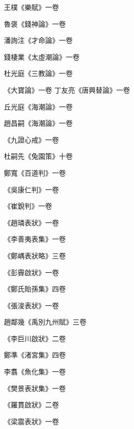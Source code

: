 \begin{pinyinscope}
 王樸《樂賦》一卷



 魯褒《錢神論》一卷



 潘詢注《才命論》一卷



 錢棲業《太虛潮論》一卷



 杜光庭《三教論》一卷



 《大寶論》一卷
 丁友亮《唐興替論》一卷



 丘光庭《海潮論》一卷



 趙昌嗣《海潮論》一卷



 《九證心戒》一卷



 杜嗣先《兔園策》十卷



 鄭寬《百道判》一卷



 《吳康仁判》一卷



 《崔銳判》一卷



 《趙璘表狀》一卷



 《李善夷表集》一卷



 《鄭嵎表狀略》三卷



 《彭霽啟狀》一卷



 《鄭氏貽孫集》四卷



 《張浚表狀》一卷



 趙鄰幾《禹別九州賦》三卷



 《李巨川啟狀》二卷



 鄭準《渚宮集》四卷



 李翥《魚化集》一卷



 《樊景表狀集》一卷



 《羅貫啟狀》二卷



 《梁震表狀》一卷




\end{pinyinscope}
